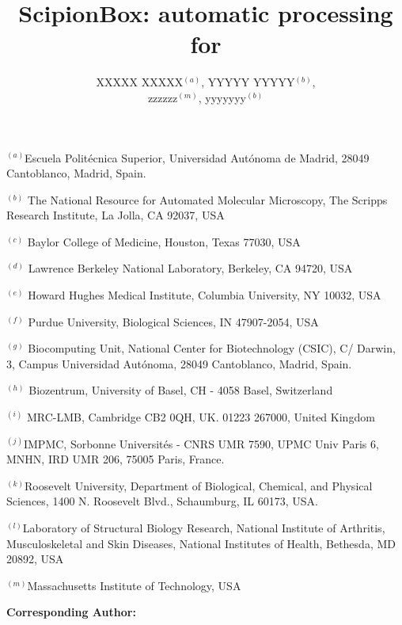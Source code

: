\documentclass[12pt]{article}
\newcommand{\lyxaddress}[1]{
   \par {\raggedright #1
   \vspace{1.4em}
   \noindent\par}
}
\begin{document}
\title{ScipionBox: automatic processing for }
\author{XXXXX XXXXX$^{(a)}$, 
        YYYYY YYYYY$^{(b)}$, \\
        zzzzzz$^{(m)}$,
        yyyyyyy$^{(b)}$
        }

\maketitle

\lyxaddress{{\small \vspace{-0.5cm}$^{(a)}$Escuela Polit\'{e}cnica Superior, Universidad Aut\'{o}noma de Madrid, 28049 Cantoblanco, Madrid, Spain.}}
\lyxaddress{{\small$^{(b)}$ The National Resource for Automated Molecular Microscopy, The Scripps Research Institute, La Jolla, CA 92037, USA}}
\lyxaddress{{\small$^{(c)}$ Baylor College of Medicine, Houston, Texas 77030, USA}}
\lyxaddress{{\small$^{(d)}$ Lawrence Berkeley National Laboratory, Berkeley, CA 94720, USA}}
\lyxaddress{{\small$^{(e)}$ Howard Hughes Medical Institute, Columbia University, NY 10032, USA}}
\lyxaddress{{\small$^{(f)}$ Purdue University, Biological Sciences, IN 47907-2054, USA}}
\lyxaddress{{\small$^{(g)}$ Biocomputing Unit, National Center for Biotechnology (CSIC), C/ Darwin, 3, Campus Universidad Aut\'{o}noma, 28049 Cantoblanco,
Madrid, Spain.}}
\lyxaddress{{\small$^{(h)}$ Biozentrum, University of Basel, CH - 4058 Basel, Switzerland}}
\lyxaddress{{\small$^{(i)}$ MRC-LMB, Cambridge CB2 0QH, UK. 01223 267000, United Kingdom}}
\lyxaddress{{\small$^{(j)}$IMPMC, Sorbonne Universit\'{e}s - CNRS UMR 7590, UPMC Univ Paris 6, MNHN, IRD UMR 206, 75005 Paris, France.}} 
\lyxaddress{{\small$^{(k)}$Roosevelt University, Department of Biological, Chemical, and Physical Sciences, 1400 N. Roosevelt Blvd., Schaumburg, IL 60173, USA.}}
\lyxaddress{{\small$^{(l)}$Laboratory of Structural Biology Research, National Institute of Arthritis, Musculoskeletal and Skin Diseases,
National Institutes of Health, Bethesda, MD 20892, USA}}
\lyxaddress{{\small$^{(m)}$Massachusetts Institute of Technology, USA}}
% 
% 

\setcounter{figure}{2}%
\textbf{Corresponding Author:} %
\end{document}
